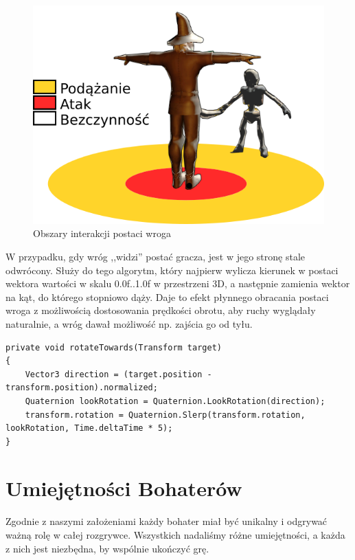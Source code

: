 \documentclass[openright]{xmgr}
\begin{document}
    \begin{figure}[H]
    \center
    \includegraphics[width=\textwidth]{poruszanie_wrogow_1.png}
    \caption{Obszary interakcji postaci wroga}
    \end{figure}

    W przypadku, gdy wróg ,,widzi'' postać gracza, jest w jego stronę stale odwrócony. Służy do tego algorytm, który najpierw wylicza kierunek w postaci wektora wartości w skalu 0.0f..1.0f w przestrzeni 3D, a następnie zamienia wektor na kąt, do którego stopniowo dąży. Daje to efekt płynnego obracania postaci wroga z możliwością dostosowania prędkości obrotu, aby ruchy wyglądały naturalnie, a wróg dawał możliwość np. zajścia go od tyłu.

\begin{minipage}{\textwidth}
\begin{lstlisting}[caption={Algorytm obracania postaci wroga w kierunku gracza}]
private void rotateTowards(Transform target)
{
    Vector3 direction = (target.position - transform.position).normalized;
    Quaternion lookRotation = Quaternion.LookRotation(direction);
    transform.rotation = Quaternion.Slerp(transform.rotation, lookRotation, Time.deltaTime * 5);
}
\end{lstlisting}
\end{minipage}

  \section{Umiejętności Bohaterów}

    Zgodnie z naszymi założeniami każdy bohater miał być unikalny i odgrywać ważną rolę w całej rozgrywce. Wszystkich nadaliśmy różne umiejętności, a każda z nich jest niezbędna, by wspólnie ukończyć grę.
\end{document}
